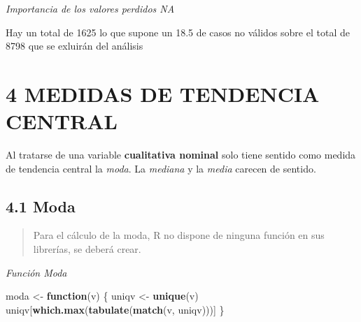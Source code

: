 \documentclass[
]{article}
\newenvironment{Shaded}{\begin{snugshade}}{\end{snugshade}}
\newcommand{\ControlFlowTok}[1]{\textcolor[rgb]{0.13,0.29,0.53}{\textbf{#1}}}
\newcommand{\DecValTok}[1]{\textcolor[rgb]{0.00,0.00,0.81}{#1}}
\newcommand{\FunctionTok}[1]{\textcolor[rgb]{0.13,0.29,0.53}{\textbf{#1}}}
\newcommand{\NormalTok}[1]{#1}
\newcommand{\OtherTok}[1]{\textcolor[rgb]{0.56,0.35,0.01}{#1}}
\newcommand{\SpecialCharTok}[1]{\textcolor[rgb]{0.81,0.36,0.00}{\textbf{#1}}}
\begin{document}
\begin{Shaded}
\end{Shaded}

\emph{Importancia de los valores perdidos NA}

Hay un total de 1625 lo que supone un 18.5 de casos no válidos sobre el
total de 8798 que se exluirán del análisis

\hypertarget{medidas-de-tendencia-central}{%
\section{4 MEDIDAS DE TENDENCIA
CENTRAL}\label{medidas-de-tendencia-central}}

Al tratarse de una variable \textbf{cualitativa nominal} solo tiene
sentido como medida de tendencia central la \emph{moda}. La
\emph{mediana} y la \emph{media} carecen de sentido.

\hypertarget{moda}{%
\subsection{4.1 Moda}\label{moda}}

\begin{quote}
Para el cálculo de la moda, R no dispone de ninguna función en sus
librerías, se deberá crear.
\end{quote}

\emph{Función Moda}

\begin{Shaded}
\begin{Highlighting}[]
\NormalTok{moda }\OtherTok{\textless{}{-}} \ControlFlowTok{function}\NormalTok{(v) \{}
\NormalTok{  uniqv }\OtherTok{\textless{}{-}} \FunctionTok{unique}\NormalTok{(v)}
\NormalTok{  uniqv[}\FunctionTok{which.max}\NormalTok{(}\FunctionTok{tabulate}\NormalTok{(}\FunctionTok{match}\NormalTok{(v, uniqv)))]}
\NormalTok{\}}
\end{Highlighting}
\end{Shaded}
\end{document}
